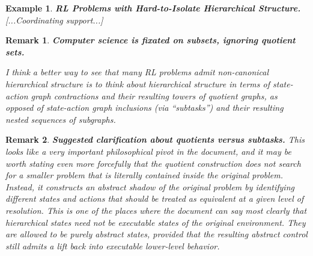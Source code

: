\documentclass[11pt]{article}
\newtheorem{remark}{Remark}[subsection]
\newtheorem{example}{Example}[subsection]
\begin{document}
\begin{example}\label{ex: counterpoint}
{\bf RL Problems with Hard-to-Isolate Hierarchical Structure.}
\normalfont
	\cite{CAL}
[...Coordinating support...]
\end{example}

\begin{remark}
{\bf Computer science is fixated on {\em subsets}, ignoring {\em quotient sets}.}
\normalfont
[...]

I think a better way to see that many RL problems admit non-canonical hierarchical structure is to think about hierarchical structure in terms of state-action graph {\em contractions} and their resulting {\em towers of quotient graphs}, as opposed of state-action graph {\em inclusions} (via ``subtasks'') and their resulting {\em nested sequences of subgraphs}.
\end{remark}

{\color{blue}
\begin{remark}
{\bf Suggested clarification about quotients versus subtasks.}
\normalfont
This looks like a very important philosophical pivot in the document, and it may be worth stating even more forcefully that the quotient construction does {\em not} search for a smaller problem that is literally contained inside the original problem. Instead, it constructs an {\em abstract shadow} of the original problem by identifying different states and actions that should be treated as equivalent at a given level of resolution. This is one of the places where the document can say most clearly that hierarchical states need not be executable states of the original environment. They are allowed to be purely abstract states, provided that the resulting abstract control still admits a lift back into executable lower-level behavior.
\end{remark}
}
\end{document}
